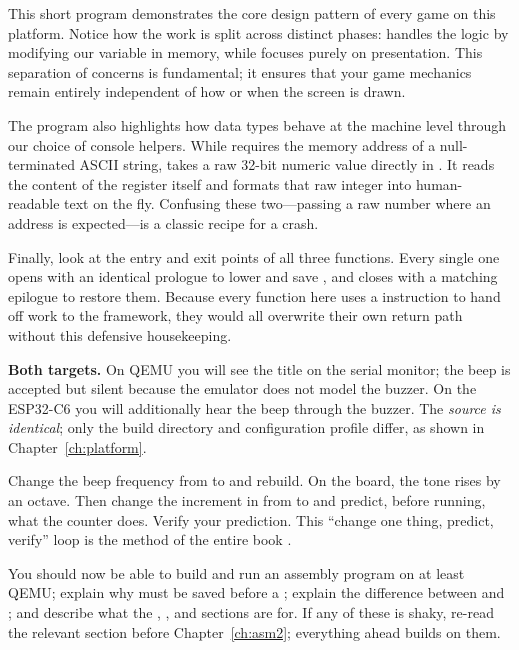 

This short program demonstrates the core design pattern of every game on this platform. 
Notice how the work is split across distinct phases:  handles the logic 
by modifying our variable in memory, while  focuses purely on presentation. 
This separation of concerns is fundamental; it ensures that your game mechanics remain entirely 
independent of how or when the screen is drawn.

The program also highlights how data types behave at the machine level through our choice 
of console helpers. While  requires the memory address of a null-terminated 
ASCII string,  takes a raw 32-bit numeric value directly in . It 
reads the content of the register itself and formats that raw integer into human-readable text 
on the fly. Confusing these two---passing a raw number where an address is expected---is a classic 
recipe for a crash.

Finally, look at the entry and exit points of all three functions. Every single one opens 
with an identical prologue to lower  and save , and closes with a matching 
epilogue to restore them. Because every function here uses a  instruction to hand 
off work to the framework, they would all overwrite their own return path without this defensive 
housekeeping.

\begin{prgtargets}
\textbf{Both targets.} On QEMU you will see the title on the serial monitor; the
beep is accepted but silent because the emulator does not model the buzzer. On the
ESP32\nobreakdash-C6 you will additionally hear the beep through the buzzer. The
\emph{source is identical}; only the build directory and configuration profile
differ, as shown in Chapter~\ref{ch:platform}.
\end{prgtargets}

\begin{prgtry}
Change the beep frequency from  to  and rebuild. On the board,
the tone rises by an octave. Then change the increment in 
from  to  and predict, before running, what the counter does.
Verify your prediction. This ``change one thing, predict, verify'' loop is the
method of the entire book \citep{prg32repo}.
\end{prgtry}

\begin{prgcheck}
You should now be able to build and run an assembly program on at least QEMU;
explain why  must be saved before a ; explain the difference
between  and ; and describe what the , ,
and  sections are for. If any of these is shaky, re-read the
relevant section before Chapter~\ref{ch:asm2}; everything ahead builds on them.
\end{prgcheck}
